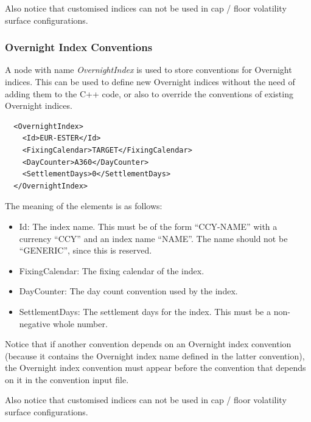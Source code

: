 Also notice that customised indices can not be used in cap / floor volatility surface configurations.

\subsubsection{Overnight Index Conventions}

A node with name \emph{OvernightIndex} is used to store conventions for Overnight indices. This can be used to define
new Overnight indices without the need of adding them to the C++ code, or also to override the conventions of existing
Overnight indices.

\begin{listing}[H]
\begin{verbatim}
  <OvernightIndex>
    <Id>EUR-ESTER</Id>
    <FixingCalendar>TARGET</FixingCalendar>
    <DayCounter>A360</DayCounter>
    <SettlementDays>0</SettlementDays>
  </OvernightIndex>
\end{verbatim}
\caption{Overnight index convention}
\label{lst:overnight_index_conventions}
\end{listing}

The meaning of the elements is as follows:

\begin{itemize}
\item Id: The index name. This must be of the form ``CCY-NAME'' with a currency ``CCY'' and an index name ``NAME''. The
  name should not be ``GENERIC'', since this is reserved.
\item FixingCalendar: The fixing calendar of the index.
\item DayCounter: The day count convention used by the index.
\item SettlementDays: The settlement days for the index. This must be a non-negative whole number.
\end{itemize}

Notice that if another convention depends on an Overnight index convention (because it contains the Overnight index name
defined in the latter convention), the Overnight index convention must appear before the convention that depends on it
in the convention input file.

Also notice that customised indices can not be used in cap / floor volatility surface configurations.

